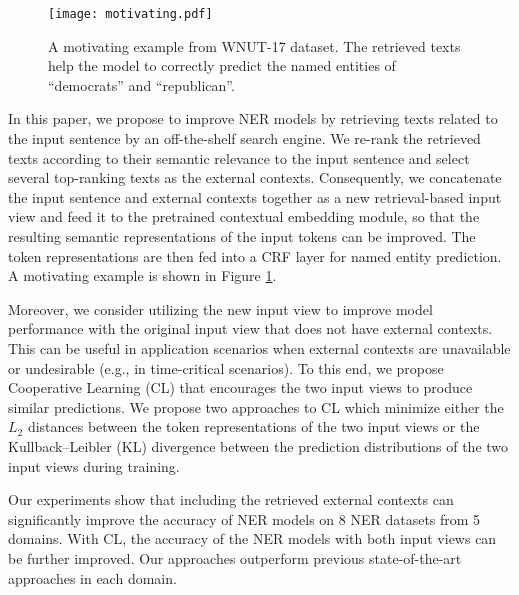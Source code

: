 \begin{figure}[t]
	\centering
	\texttt{[image: motivating.pdf]}
	\caption{A motivating example from WNUT-17 dataset. The retrieved texts help the model to correctly predict the named entities of ``democrats'' and ``republican''.}
	\label{fig:motivate}
\end{figure}

In this paper, we propose to improve NER models by retrieving texts related to the input sentence by an off-the-shelf search engine. We re-rank the retrieved texts according to their semantic relevance to the input sentence and select several top-ranking texts as the external contexts. Consequently, we concatenate the input sentence and external contexts together as a new retrieval-based input view and feed it to the pretrained contextual embedding module, so that the resulting semantic representations of the input tokens can be improved. The token representations are then fed into a CRF layer for named entity prediction. A motivating example is shown in Figure \ref{fig:motivate}.

Moreover, we consider utilizing the new input view to improve model performance with the original input view that does not have external contexts. This can be useful in application scenarios when external contexts are unavailable or undesirable (e.g., in time-critical scenarios). To this end, we propose Cooperative Learning (CL) that encourages the two input views to produce similar predictions. We propose two approaches to CL which minimize either the $L_2$ distances between the token representations of the two input views or the Kullback–Leibler (KL) divergence between the prediction distributions of the two input views during training. 

Our experiments show that including the retrieved external contexts can significantly improve the accuracy of NER models on 8 NER datasets from 5 domains. With CL, the accuracy of the NER models with both input views can be further improved. Our approaches outperform previous state-of-the-art approaches in each domain. 

